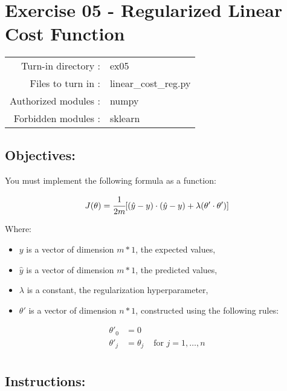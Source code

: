 \documentclass[]{article}
\begin{document}
\clearpage

\hypertarget{exercise-05---regularized-linear-cost-function-1}{%
\section{Exercise 05 - Regularized Linear Cost
Function}\label{exercise-05---regularized-linear-cost-function-1}}

\begin{longtable}[]{@{}rl@{}}
\toprule
\endhead
Turn-in directory : & ex05\tabularnewline
Files to turn in : & linear\_cost\_reg.py\tabularnewline
Authorized modules : & numpy\tabularnewline
Forbidden modules : & sklearn\tabularnewline
\bottomrule
\end{longtable}

\hypertarget{objectives-4}{%
\subsection{Objectives:}\label{objectives-4}}

You must implement the following formula as a function:

\large

\[
J(\theta)  =  \cfrac{1}{2m}[(\hat{y} - y)\cdot(\hat{y}- y) + \lambda (\theta' \cdot \theta')]
\] \normalsize

Where:

\begin{itemize}
\item
  \(y\) is a vector of dimension \(m * 1\), the expected values,
\item
  \(\hat{y}\) is a vector of dimension \(m * 1\), the predicted values,
\item
  \(\lambda\) is a constant, the regularization hyperparameter,
\item
  \(\theta'\) is a vector of dimension \(n * 1\), constructed using the
  following rules:
\end{itemize}

\large

\[
\begin{matrix}
\theta'_0 & =  0 \\
\theta'_j & =  \theta_j & \text{ for } j = 1, \dots, n\\    
\end{matrix}
\] \normalsize

\hypertarget{instructions-4}{%
\subsection{Instructions:}\label{instructions-4}}
\end{document}
